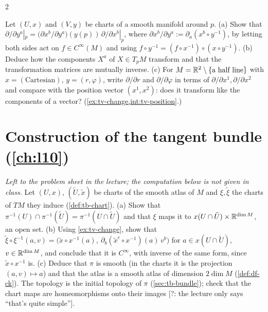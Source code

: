 \begin{paracol}{2}
\begin{exercise}\label{ex:tv-change-full}
Let $(U,x)$ and $(V,y)$ be charts of a smooth manifold around $p$. (a) Show that $\partial/\partial y^a|_p=\bigl(\partial x^b/\partial y^a\bigr)(y(p))\,\partial/\partial x^b|_p$, where $\partial x^b/\partial y^a:=\partial_a(x^b\circ y^{-1})$, by letting both sides act on $f\in C^\infty(M)$ and using
$f\circ y^{-1}=(f\circ x^{-1})\circ(x\circ y^{-1})$. (b) Deduce how the components $X^a$ of $X\in T_pM$ transform and that the transformation matrices are mutually inverse. (c) For $M=\mathbb{R}^2\setminus\{\text{a half line}\}$ with $x=(\text{Cartesian})$, $y=(r,\varphi)$, write
$\partial/\partial r$ and $\partial/\partial\varphi$ in terms of $\partial/\partial x^1,\partial/\partial x^2$ and compare with the position vector $(x^1,x^2)$: does it transform like the components of a vector? (\cref{ex:tv-change,int:tv-position}.)
\end{exercise}

\section{Construction of the tangent bundle (\cref{ch:l10})}\label{exam:ch10}

\begin{exercise}\label{ex:tb-compat-full}
\emph{Left to the problem sheet in the lecture; the computation below is not given in class.} Let $(U,x)$, $(\tilde U,\tilde x)$ be charts of the smooth atlas of $M$ and $\xi,\tilde\xi$ the charts of $TM$ they induce (\cref{def:tb-chart}). (a) Show that $\pi^{-1}(U)\cap\pi^{-1}(\tilde U)=\pi^{-1}(U\cap\tilde U)$ and that $\xi$ maps it to
$x(U\cap\tilde U)\times\mathbb{R}^{\dim M}$, an open set. (b) Using \cref{ex:tv-change}, show that
$\tilde\xi\circ\xi^{-1}(a,v)=\bigl(\tilde x\circ x^{-1}(a),\ \partial_b(\tilde x^c\circ x^{-1})(a)\,v^b\bigr)$ for $a\in x(U\cap\tilde U)$, $v\in\mathbb{R}^{\dim M}$, and conclude that it is $C^\infty$, with inverse of the same form, since $\tilde x\circ x^{-1}$ is. (c) Deduce that $\pi$ is smooth (in the charts it is the projection $(a,v)\mapsto a$) and that
the atlas is a smooth atlas of dimension $2\dim M$ (\cref{def:df-ck}). The topology is the initial topology of $\pi$ (\cref{sec:tb-bundle}); check that the chart maps are homeomorphisms onto their images [?: the lecture only says ``that's quite simple''].
\end{exercise}


\end{paracol}
